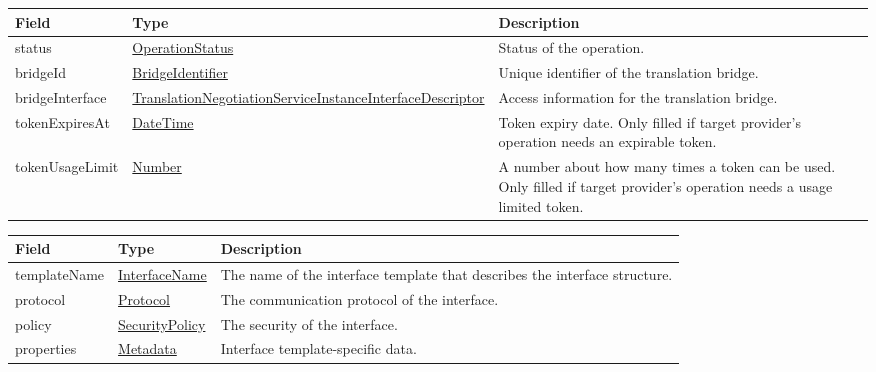 \documentclass[a4paper]{arrowhead}
\newcommand{\pref}[1]{{\textcolor{ArrowheadGrey}{\hyperref[sec:model:primitives:#1]{#1}}}}
\begin{document}

\begin{table}[ht!]
\begin{tabularx}{\textwidth}{| p{4.25cm} | p{5.5cm} | X |} \hline
\rowcolor{gray!33} Field & Type      & Description \\ \hline
status & \pref{OperationStatus} & Status of the operation. \\ \hline
bridgeId & \pref{BridgeIdentifier} & Unique identifier of the translation bridge. \\ \hline
bridgeInterface & \hyperref[sec:model:TranslationNegotiationServiceInstanceInterfaceDescriptor]{Translation\-Negotiation\-Service\-Instance\-Interface\-Descriptor}  & Access information for the translation bridge. \\ \hline
tokenExpiresAt & \pref{DateTime} & Token expiry date. Only filled if target pro\-vider's operation needs an expirable token. \\ \hline
tokenUsageLimit & \pref{Number} & A number about how many times a token can be used. Only filled if target provider's operation needs a usage limited token. \\ \hline
\end{tabularx}
\end{table}


\begin{table}[ht!]
\begin{tabularx}{\textwidth}{| p{3.9cm} | p{4cm} | X |} \hline
\rowcolor{gray!33} Field & Type & Description \\ \hline
templateName & \pref{InterfaceName} & The name of the interface template that describes the interface structure. \\ \hline
protocol & \pref{Protocol} & The communication protocol of the interface. \\ \hline
policy & \pref{SecurityPolicy} & The security of the interface. \\ \hline
properties &\hyperref[sec:model:Metadata]{Metadata} & Interface template-specific data. \\ \hline
\end{tabularx}
\end{table}

\clearpage

 
\end{document}
